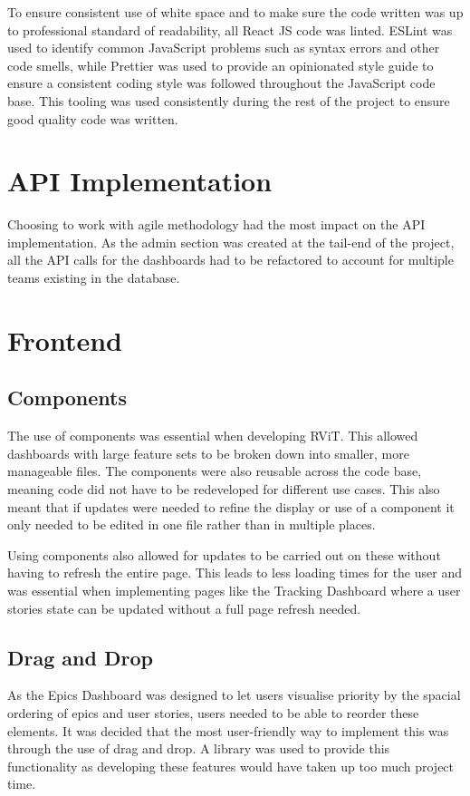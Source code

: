 \documentclass[l4proj.tex]{subfiles}
\begin{document}
 To ensure consistent use of white space and to make sure the code written was up to professional standard of readability, all React JS code was linted. ESLint was used to identify common JavaScript problems such as syntax errors and other code smells, while Prettier was used to provide an opinionated style guide to ensure a consistent coding style was followed throughout the JavaScript code base. This tooling was used consistently during the rest of the project to ensure good quality code was written.


\section{API Implementation}
Choosing to work with agile methodology had the most impact on the API implementation. As the admin section was created at the tail-end of the project, all the API calls for the dashboards had to be refactored to account for multiple teams existing in the database. 

\section{Frontend}

\subsection{Components}
The use of components was essential when developing RViT. This allowed dashboards with large feature sets to be broken down into smaller, more manageable files. The components were also reusable across the code base, meaning code did not have to be redeveloped for different use cases. This also meant that if updates were needed to refine the display or use of a component it only needed to be edited in one file rather than in multiple places. 

Using components also allowed for updates to be carried out on these without having to refresh the entire page. This leads to less loading times for the user and was essential when implementing pages like the Tracking Dashboard where a user stories state can be updated without a full page refresh needed. 

\subsection{Drag and Drop}
As the Epics Dashboard was designed to let users visualise priority by the spacial ordering of epics and user stories, users needed to be able to reorder these elements. It was decided that the most user-friendly way to implement this was through the use of drag and drop. A library was used to provide this functionality as developing these features would have taken up too much project time. 
\end{document}

